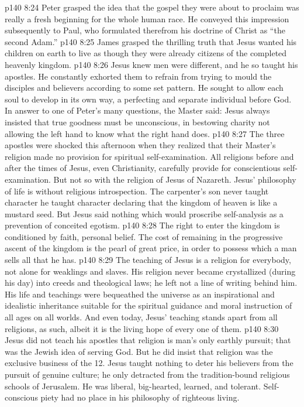 \vs p140 8:24 Peter grasped the idea that the gospel they were about to proclaim was really a fresh beginning for the whole human race. He conveyed this impression subsequently to Paul, who formulated therefrom his doctrine of Christ as “the second Adam.”
\vs p140 8:25 James grasped the thrilling truth that Jesus wanted his children on earth to live as though they were already citizens of the completed heavenly kingdom.
\vs p140 8:26 \pc Jesus knew men were different, and he so taught his apostles. He constantly exhorted them to refrain from trying to mould the disciples and believers according to some set pattern. He sought to allow each soul to develop in its own way, a perfecting and separate individual before God. In answer to one of Peter’s many questions, the Master said:  Jesus always insisted that true goodness must be unconscious, in bestowing charity not allowing the left hand to know what the right hand does.
\vs p140 8:27 The three apostles were shocked this afternoon when they realized that their Master’s religion made no provision for spiritual self\hyp{}examination. All religions before and after the times of Jesus, even Christianity, carefully provide for conscientious self\hyp{}examination. But not so with the religion of Jesus of Nazareth. Jesus’ philosophy of life is without religious introspection. The carpenter’s son never taught character  he taught character  declaring that the kingdom of heaven is like a mustard seed. But Jesus said nothing which would proscribe self\hyp{}analysis as a prevention of conceited egotism.
\vs p140 8:28 The right to enter the kingdom is conditioned by faith, personal belief. The cost of remaining in the progressive ascent of the kingdom is the pearl of great price, in order to possess which a man sells all that he has.
\vs p140 8:29 The teaching of Jesus is a religion for everybody, not alone for weaklings and slaves. His religion never became crystallized (during his day) into creeds and theological laws; he left not a line of writing behind him. His life and teachings were bequeathed the universe as an inspirational and idealistic inheritance suitable for the spiritual guidance and moral instruction of all ages on all worlds. And even today, Jesus’ teaching stands apart from all religions, as such, albeit it is the living hope of every one of them.
\vs p140 8:30 Jesus did not teach his apostles that religion is man’s only earthly pursuit; that was the Jewish idea of serving God. But he did insist that religion was the exclusive business of the 12. Jesus taught nothing to deter his believers from the pursuit of genuine culture; he only detracted from the tradition\hyp{}bound religious schools of Jerusalem. He was liberal, big\hyp{}hearted, learned, and tolerant. Self\hyp{}conscious piety had no place in his philosophy of righteous living.
